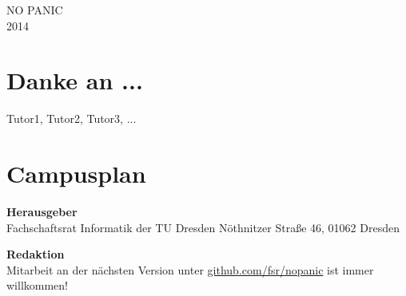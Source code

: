 \documentclass[12pt]{article}
\begin{document}
NO PANIC \\
2014
\newpage


\tableofcontents


\section{Danke an ...}

Tutor1, Tutor2, Tutor3, ...


















\section{Campusplan}



\newpage
\textbf{Herausgeber} \\
Fachschaftsrat Informatik der TU Dresden
Nöthnitzer Straße 46, 01062 Dresden

\textbf{Redaktion} \\

Mitarbeit an der nächsten Version unter \url{github.com/fsr/nopanic} ist immer willkommen!
\end{document}
